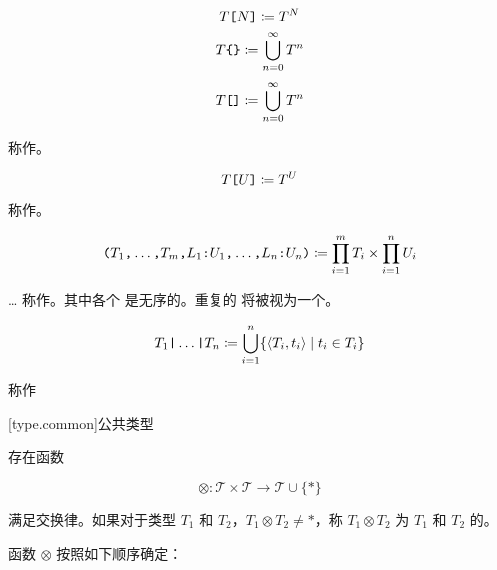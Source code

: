 $$ T\texttt{[}N\texttt{]} \coloneqq T^N $$
$$ T\texttt{\{\}} \coloneqq \bigcup^\infty_{n=0} T^n $$
$$ T\texttt{[]} \coloneqq \bigcup^\infty_{n=0} T^n $$

\pnum
{} 称作。

$$ T\texttt{[}U\texttt{]} \coloneqq T^U $$

\pnum
{} 称作。

$$ \texttt{(}T_1\texttt{,} \ldots\texttt{,} T_m\texttt{,} L_1\texttt{:} U_1\texttt{,} \ldots\texttt{,} L_n\texttt{:} U_n\texttt{)} \coloneqq \prod^m_{i=1} T_i \times \prod^n_{i=1} U_i $$

\pnum
{}\ldots{} 称作。其中各个  是无序的。重复的  将被视为一个。

$$ T_1 \texttt{|} \ldots \texttt{|} T_n \coloneqq \bigcup^n_{i=1} \{ \langle T_i, t_i \rangle \mid t_i \in T_i \} $$

\pnum
{} 称作

[type.common]{公共类型}

\pnum
存在函数

$$ \otimes: \mathcal{T} \times \mathcal{T} \rightarrow \mathcal{T} \cup \{ \ast \} $$

满足交换律。如果对于类型 $T_1$ 和 $T_2$，$T_1 \otimes T_2 \ne \ast$，称 $T_1 \otimes T_2$ 为 $T_1$ 和 $T_2$ 的。

\pnum
函数 $\otimes$ 按照如下顺序确定：

